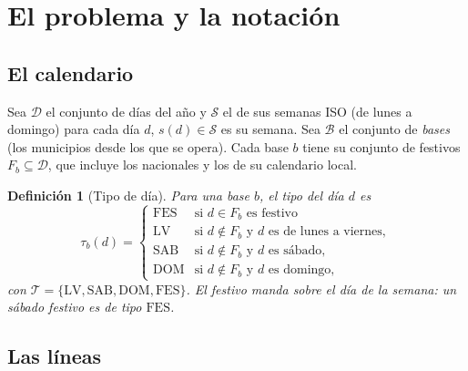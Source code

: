 \documentclass[11pt,a4paper]{article}
\newtheorem{definicion}{Definición}
\newcommand{\Dias}{\mathcal{D}}
\newcommand{\Sem}{\mathcal{S}}
\newcommand{\Bases}{\mathcal{B}}
\newcommand{\Tipos}{\mathcal{T}}
\begin{document}
\section{El problema y la notación}

\subsection{El calendario}

Sea $\Dias$ el conjunto de días del año y $\Sem$ el de sus semanas ISO (de lunes a domingo) para
cada día $d$, $s(d) \in \Sem$ es su semana. Sea $\Bases$ el conjunto de \emph{bases} (los
municipios desde los que se opera). Cada base $b$ tiene su conjunto de festivos
$F_b \subseteq \Dias$, que incluye los nacionales y los de su calendario local.

\begin{definicion}[Tipo de día]
Para una base $b$, el tipo del día $d$ es
\[
  \tau_b(d) =
  \begin{cases}
    \mathrm{FES} & \text{si } d \in F_b \text{ es festivo}\\
    \mathrm{LV}  & \text{si } d \notin F_b \text{ y } d \text{ es de lunes a viernes},\\
    \mathrm{SAB} & \text{si } d \notin F_b \text{ y } d \text{ es sábado},\\
    \mathrm{DOM} & \text{si } d \notin F_b \text{ y } d \text{ es domingo},
  \end{cases}
\]
con $\Tipos = \{\mathrm{LV}, \mathrm{SAB}, \mathrm{DOM}, \mathrm{FES}\}$. El festivo manda sobre
el día de la semana: un sábado festivo es de tipo $\mathrm{FES}$.
\end{definicion}

\subsection{Las líneas}
\end{document}
